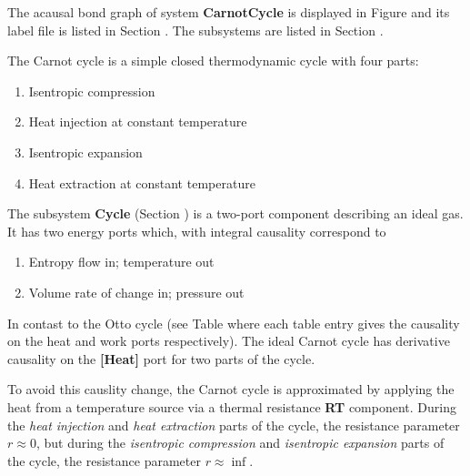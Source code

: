 

   The acausal bond graph of system \textbf{CarnotCycle} is
   displayed in Figure  and its label
   file is listed in Section .
   The subsystems are listed in Section .

The Carnot cycle is a simple closed thermodynamic cycle with four parts:
\begin{enumerate}
\item Isentropic compression
\item Heat injection at constant temperature
\item Isentropic expansion
\item Heat extraction at constant temperature
\end{enumerate}

The subsystem \textbf{Cycle} (Section ) is a two-port
component describing an ideal gas. It has two energy ports which, with
integral causality correspond to
\begin{enumerate}
\item Entropy flow in; temperature out
\item Volume rate of change in; pressure out
\end{enumerate}

In contast to the Otto cycle (see Table
 where each table entry gives the causality on the
heat and work ports respectively). The ideal Carnot cycle has
derivative causality on the {\bf [Heat]} port for two parts of the
cycle.

To avoid this causlity change, the Carnot cycle is approximated by
applying the heat from a temperature source via a thermal resistance
{\bf RT} component. During the {\em heat injection\/} and {\em heat
extraction\/} parts of the cycle, the resistance parameter $r\approx
0$, but during the {\em isentropic compression\/} and {\em isentropic
expansion\/} parts of the cycle, the resistance parameter $r\approx
\inf$.

